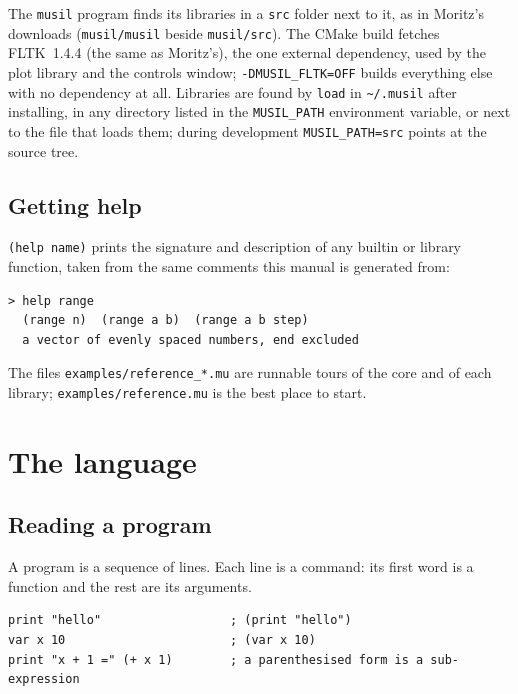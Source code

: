 \documentclass[11pt,a4paper]{article}
\newcommand{\musil}[1]{\lstinline[style=musilinline]{#1}}
\begin{document}
The \texttt{musil} program finds its libraries in a \texttt{src} folder next to it, as
in Moritz's downloads (\texttt{musil/musil} beside \texttt{musil/src}). The CMake build
fetches FLTK~1.4.4 (the same as Moritz's), the one external dependency, used by the plot library and the controls
window; \texttt{-DMUSIL\_FLTK=OFF} builds everything else with no
dependency at all. Libraries are found by \musil{load} in \texttt{\textasciitilde/.musil}
after installing, in any directory listed in the \texttt{MUSIL\_PATH} environment
variable, or next to the file that loads them; during development
\texttt{MUSIL\_PATH=src} points at the source tree.

\subsection{Getting help}

\musil{(help name)} prints the signature and description of any builtin or library
function, taken from the same comments this manual is generated from:

\begin{lstlisting}[numbers=none]
> help range
  (range n)  (range a b)  (range a b step)
  a vector of evenly spaced numbers, end excluded
\end{lstlisting}

The files \texttt{examples/reference\_*.mu} are runnable tours of the core and of each
library; \texttt{examples/reference.mu} is the best place to start.

\section{The language}
\label{sec:language}

\subsection{Reading a program}

A program is a sequence of lines. Each line is a command: its first word is a function
and the rest are its arguments.

\begin{lstlisting}
print "hello"                  ; (print "hello")
var x 10                       ; (var x 10)
print "x + 1 =" (+ x 1)        ; a parenthesised form is a sub-expression
\end{lstlisting}
\end{document}
